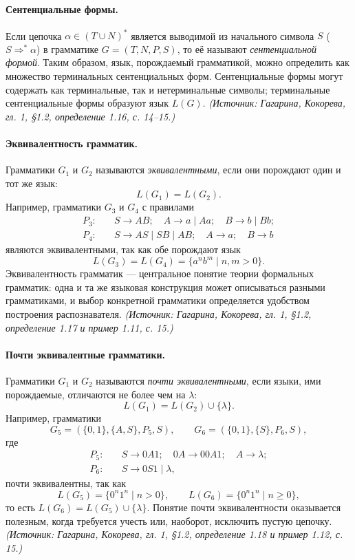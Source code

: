\documentclass[a4paper,12pt]{article}
\begin{document}
\paragraph{Сентенциальные формы.}
Если цепочка \(\alpha\in(T\cup N)^*\) является выводимой из начального символа \(S\) (\(S\Rightarrow^*\alpha\)) в грамматике \(G=(T,N,P,S)\), то её называют \emph{сентенциальной формой}. Таким образом, язык, порождаемый грамматикой, можно определить как множество терминальных сентенциальных форм. Сентенциальные формы могут содержать как терминальные, так и нетерминальные символы; терминальные сентенциальные формы образуют язык \(L(G)\).
\textit{(Источник: Гагарина, Кокорева, гл. 1, §1.2, определение 1.16, с. 14--15.)}

\paragraph{Эквивалентность грамматик.}
Грамматики \(G_1\) и \(G_2\) называются \emph{эквивалентными}, если они порождают один и тот же язык:
\[
L(G_1)=L(G_2).
\]
Например, грамматики \(G_3\) и \(G_4\) с правилами
\[
\begin{aligned}
P_3:\quad & S\to AB;\quad A\to a\mid Aa;\quad B\to b\mid Bb;\\
P_4:\quad & S\to AS\mid SB\mid AB;\quad A\to a;\quad B\to b
\end{aligned}
\]
являются эквивалентными, так как обе порождают язык
\[
L(G_3)=L(G_4)=\{a^n b^m\mid n,m>0\}.
\]
Эквивалентность грамматик — центральное понятие теории формальных грамматик: одна и та же языковая конструкция может описываться разными грамматиками, и выбор конкретной грамматики определяется удобством построения распознавателя.
\textit{(Источник: Гагарина, Кокорева, гл. 1, §1.2, определение 1.17 и пример 1.11, с. 15.)}

\paragraph{Почти эквивалентные грамматики.}
Грамматики \(G_1\) и \(G_2\) называются \emph{почти эквивалентными}, если языки, ими порождаемые, отличаются не более чем на \(\lambda\):
\[
L(G_1)=L(G_2)\cup\{\lambda\}.
\]
Например, грамматики
\[
G_5=(\{0,1\},\{A,S\},P_5,S),\qquad
G_6=(\{0,1\},\{S\},P_6,S),
\]
где
\[
\begin{aligned}
P_5:\quad & S\to0A1;\quad 0A\to00A1;\quad A\to\lambda;\\
P_6:\quad & S\to0S1\mid\lambda,
\end{aligned}
\]
почти эквивалентны, так как
\[
L(G_5)=\{0^n1^n\mid n>0\},\qquad
L(G_6)=\{0^n1^n\mid n\ge0\},
\]
то есть \(L(G_6)=L(G_5)\cup\{\lambda\}\). Понятие почти эквивалентности оказывается полезным, когда требуется учесть или, наоборот, исключить пустую цепочку.
\textit{(Источник: Гагарина, Кокорева, гл. 1, §1.2, определение 1.18 и пример 1.12, с. 15.)}
\end{document}
